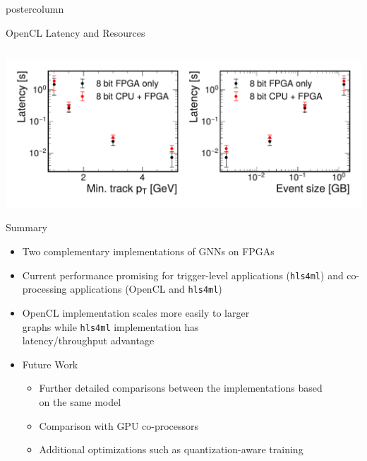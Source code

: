 \documentclass[final,hyperref={pdfpagelabels=false}]{beamer}
\newcommand{\hlsfml}{{\texttt{hls4ml}}\xspace}
\begin{document}
\begin{frame}
\begin{columns}
\begin{column}{.33\textwidth}
\begin{beamercolorbox}[center,wd=\textwidth]{postercolumn}
\begin{minipage}[T]{.95\textwidth}
{\begin{block}{OpenCL Latency and Resources}
\begin{columns}
\begin{column}{.49\textwidth}
\begin{center}
                \end{center}
               \end{column}
              \end{columns}
                \begin{center}    \includegraphics[width=\linewidth]{figures/scalability_study_v2.pdf}
                \end{center}
            \end{block}\vspace{-2cm}
            \begin{block}{Summary}
              \begin{itemize}
                \item Two complementary implementations of GNNs on FPGAs
                \item Current performance promising for trigger-level applications (\hlsfml) and co-processing applications (OpenCL and \hlsfml)
                \item OpenCL implementation scales more easily to larger \\graphs while \hlsfml implementation has\\ latency/throughput advantage
                \item Future Work
                \begin{itemize}
                    \item Further detailed comparisons between the implementations based\\ on the same model
                    \item Comparison with GPU co-processors
                    \item Additional optimizations such as quantization-aware training
                \end{itemize}
              \end{itemize}       \begin{flushright}

\end{flushright}
\end{block}}
\end{minipage}
\end{beamercolorbox}
\end{column}
\end{columns}
\end{frame}
\end{document}
